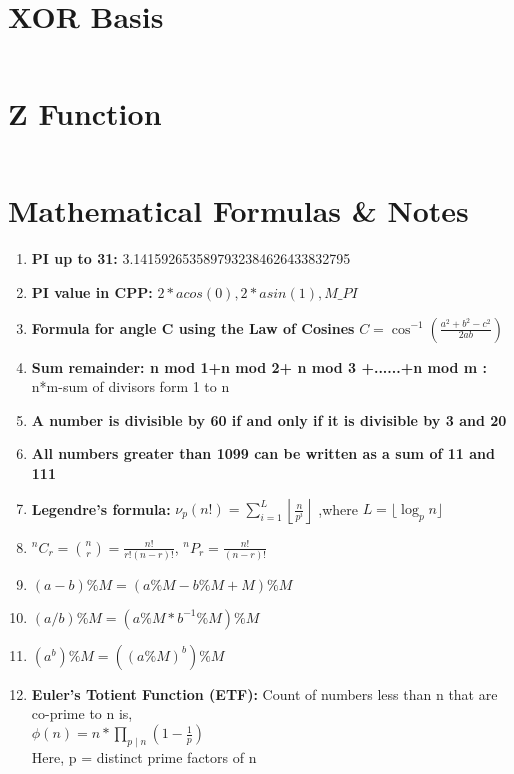 \documentclass[10pt,a4paper,landscape]{article}
\begin{document}
\begin{multicols*}{3}
		\section{XOR Basis}
		\inputminted{cpp}{codes/XOR_BASIS.cpp}
		
		\section{Z Function}
		\inputminted{cpp}{codes/Z_FUNCTION.cpp}
		
		\section{Mathematical Formulas \& Notes}
		\begin{enumerate}
			\item \textbf{PI up to 31: } 3.1415926535897932384626433832795
			\item \textbf{PI value in CPP: } $2*acos(0), 2*asin(1), M\_PI$
			
			\item\textbf{Formula for angle C using the Law of Cosines} $C = \cos^{-1} \left( \frac{a^2 + b^2 - c^2}{2ab} \right)$ 
			
			\item\textbf{Sum remainder: n mod 1+n mod 2+ n mod 3 +......+n mod m :} n*m-sum of divisors form 1 to n
			
			\item\textbf{A number is divisible by 60 if and only if it is divisible by 3 and 20}  
			
			\item\textbf{All numbers greater than 1099 can be written as a sum of 11 and 111} 
			
			\item\textbf{Legendre's formula:} $\nu _{p}(n!)=\sum _{i=1}^{L}\left\lfloor {\frac {n}{p^{i}}}\right\rfloor$
			,where ${L=\lfloor \log _{p}n\rfloor}$ 
			
			
			\item $^nC_r = \binom{n}{r} = \frac{n!}{r!(n-r)!}$, $^nP_r = \frac{n!}{(n-r)!}$
			
			\item $(a-b)\%M = (a\%M - b\%M + M)\%M$
			
			\item $(a/b)\%M = (a\%M * b^{-1}\%M)\%M$
			
			\item $(a^b)\%M = ((a\%M)^b)\%M$
			
			\item \textbf{Euler's Totient Function (ETF):} Count of numbers less than n that are co-prime to n is,\\ $\phi(n) = n * \prod_{p\mid n} (1 - \frac{1}{p})$\\Here, p = distinct prime factors of n
			

\end{enumerate}
\end{multicols*}
\end{document}
